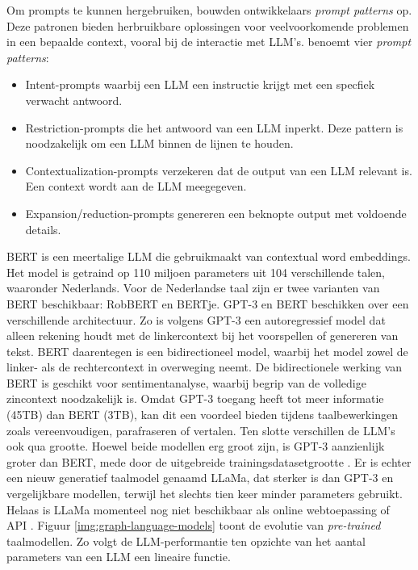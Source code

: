Om prompts te kunnen hergebruiken, bouwden ontwikkelaars \textit{prompt patterns} op. Deze patronen bieden herbruikbare oplossingen voor veelvoorkomende problemen in een bepaalde context, vooral bij de interactie met LLM's. \textcite{White2023} benoemt vier \textit{prompt patterns}:

\begin{itemize}
	\item	Intent-prompts waarbij een LLM een instructie krijgt met een specfiek verwacht antwoord.
	\item	Restriction-prompts die het antwoord van een LLM inperkt. Deze pattern is noodzakelijk om een LLM binnen de lijnen te houden.
	\item 	Contextualization-prompts verzekeren dat de output van een LLM relevant is. Een context wordt aan de LLM meegegeven.
	\item	Expansion/reduction-prompts genereren een beknopte output met voldoende details. 
\end{itemize}

\medspace

BERT is een meertalige LLM die gebruikmaakt van contextual word embeddings. Het model is getraind op 110 miljoen parameters uit 104 verschillende talen, waaronder Nederlands. Voor de Nederlandse taal zijn er twee varianten van BERT beschikbaar: RobBERT en BERTje. GPT-3 en BERT beschikken over een verschillende architectuur. Zo is volgens \textcite{Mottesi2023} GPT-3 een autoregressief model dat alleen rekening houdt met de linkercontext bij het voorspellen of genereren van tekst. BERT daarentegen is een bidirectioneel model, waarbij het model zowel de linker- als de rechtercontext in overweging neemt. De bidirectionele werking van BERT is geschikt voor sentimentanalyse, waarbij begrip van de volledige zincontext noodzakelijk is. Omdat GPT-3 toegang heeft tot meer informatie (45TB) dan BERT (3TB), kan dit een voordeel bieden tijdens taalbewerkingen zoals vereenvoudigen, parafraseren of vertalen. Ten slotte verschillen de LLM's ook qua grootte. Hoewel beide modellen erg groot zijn, is GPT-3 aanzienlijk groter dan BERT, mede door de uitgebreide trainingsdatasetgrootte \autocite{Brown2020}. Er is echter een nieuw generatief taalmodel genaamd LLaMa, dat sterker is dan GPT-3 en vergelijkbare modellen, terwijl het slechts tien keer minder parameters gebruikt. Helaas is LLaMa momenteel nog niet beschikbaar als online webtoepassing of API \autocite{Hern2023, Touvron2023}. Figuur \ref{img:graph-language-models} toont de evolutie van \textit{pre-trained} taalmodellen. Zo volgt de LLM-performantie ten opzichte van het aantal parameters van een LLM een lineaire functie.

